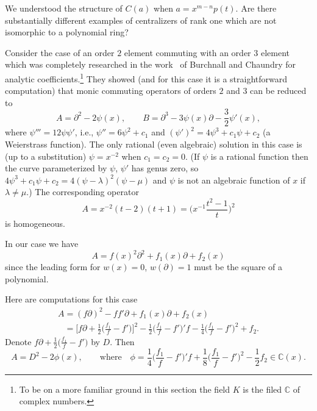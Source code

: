 \documentclass[10pt,a4paper]{amsart}
\numberwithin{equation}{section}
\newcommand{\de}{\partial}
\newcommand{\C}{\mathbb C}
\newcommand{\la}{\lambda}
\begin{document}
We understood the structure of $C(a)$ when $a = x^{m-n}p(t)$. Are there substantially different examples of centralizers of rank one which are not isomorphic to a polynomial ring?

Consider the case of an order $2$ element commuting with an order $3$ element which was completely researched in
the work~\cite{BC1} of Burchnall and Chaundry for analytic coefficients.\footnote{To be on a more familiar ground in this section the field $K$ is the filed $\C$ of complex numbers.} They showed (and for this case it is a straightforward computation) that monic commuting operators of orders $2$ and $3$ can be reduced to
\[
A = \de^2 - 2\psi(x),\qquad
B = \de^3 - 3\psi(x)\de - \frac{3}{2}\psi'(x),
\]
where $\psi''' = 12\psi\psi'$, i.e., $\psi'' = 6\psi^2 + c_1$ and $(\psi')^2 = 4\psi^3 + c_1\psi + c_2$ (a Weierstrass function). The only rational (even algebraic) solution in this case is (up to a substitution) $\psi = x^{-2}$ when $c_1 = c_2 = 0$. (If $\psi$ is a rational function then the curve parameterized by $\psi$, $\psi'$ has genus zero, so $4\psi^3 + c_1\psi + c_2 = 4(\psi - \la)^2(\psi - \mu)$ and $\psi$ is not an algebraic function of $x$ if $\la \ne \mu$.) The corresponding operator
\[
A = x^{-2}(t-2)(t+1) = \bigg(x^{-1}\frac{t^2 - 1}{t}\bigg)^2
\]
is homogeneous.

In our case we have
\[
A = f(x)^2\de^2 + f_1(x)\de + f_2(x)
\]
since the leading form for $w(x) = 0$, $w(\de) = 1$ must be the square of a polynomial.

Here are computations for this case
\begin{gather*}
A = (f\de)^2 - ff'\de + f_1(x)\de + f_2(x)
\\ \phantom{A}
{}= \bigg[f\de + \frac{1}{2}\bigg(\frac{f_1}{f} - f'\bigg)\bigg]^2 - \frac{1}{2}\bigg(\frac{f_1}{f} - f'\bigg)'f - \frac{1}{4}\bigg(\frac{f_1}{f} - f'\bigg)^2 + f_2.
\end{gather*}
Denote $f\de + \frac{1}{2}\big(\frac{f_1}{f} - f'\big)$ by $D$. Then
\[
A = D^2 - 2\phi (x), \qquad
\text{where}\quad
\phi = \frac{1}{4}\bigg(\frac{f_1}{f} - f'\bigg)'f + \frac{1}{8}\bigg(\frac{f_1}{f} - f'\bigg)^2 - \frac{1}{2}f_2 \in \C(x).
\]
\end{document}
